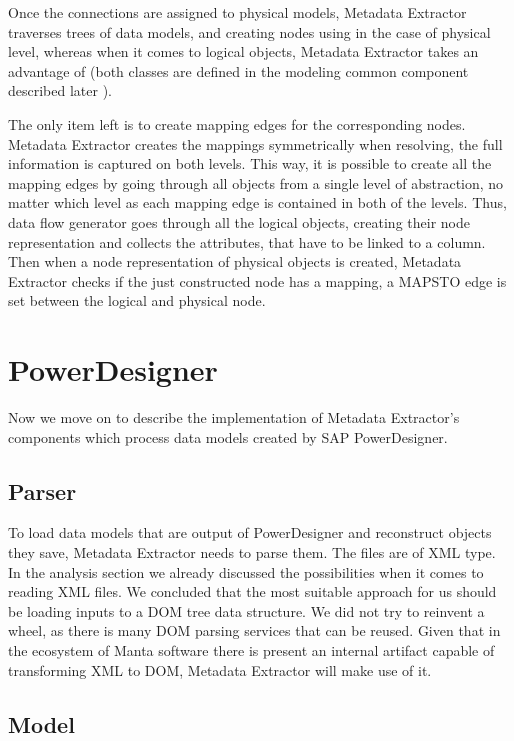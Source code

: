 Once the connections are assigned to physical models, Metadata Extractor traverses trees of data models, and creating nodes using  in the case of physical level, whereas when it comes to logical objects, Metadata Extractor takes an advantage of  (both classes are defined in the modeling common component described later ).

The only item left is to create mapping edges for the corresponding nodes.
Metadata Extractor creates the mappings symmetrically when resolving, the full information is captured on both levels. 
This way, it is possible to create all the mapping edges by going through all objects from a single level of abstraction, no matter which level as each mapping edge is contained in both of the levels.
Thus, data flow generator goes through all the logical objects, creating their node representation and collects the attributes, that have to be linked to a column.
Then when a node representation of physical objects is created, Metadata Extractor checks if the just constructed node has a mapping, a MAPS\textunderscore TO edge is set between the logical and physical node.

\section{PowerDesigner}

Now we move on to describe the implementation of Metadata Extractor's components which process data models created by SAP PowerDesigner.

\subsection{Parser}

To load data models that are output of PowerDesigner and reconstruct objects they save, Metadata Extractor needs to parse them. The files are of XML type.
In the analysis section we already discussed the possibilities when it comes to reading XML files. We concluded that the most suitable approach for us should be loading inputs to a DOM tree data structure.
We did not try to reinvent a wheel, as there is many DOM parsing services that can be reused. 
Given that in the ecosystem of Manta software there is present an internal artifact capable of transforming XML to DOM, Metadata Extractor will make use of it.

\subsection{Model}

